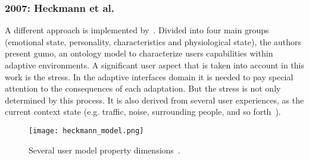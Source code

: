 
\subsubsection{2007: Heckmann et al.}
\label{sec:heckmann}

A different approach is implemented by~\citet{heckmann_gumogeneral_2005}.
Divided into four main groups (emotional state, personality, characteristics and
physiological state), the authors present \ac{gumo}, an ontology model to 
characterize users capabilities within adaptive environments. A significant 
user aspect that is taken into account in this work is the stress. In the 
adaptive interfaces domain it is needed to pay special attention to the 
consequences of each adaptation. But the stress is not only determined  by this 
process. It is also derived from several user experiences, as the current 
context state (e.g. traffic, noise, surrounding people, and so 
forth~\citep{babisch_noise_stress_2002}).


\begin{figure}[H]
\centering
\texttt{[image: heckmann\_model.png]}
\caption{Several user model property
dimensions~\citep{heckmann_gumogeneral_2005}.}
\label{fig:heckmann_model}
\end{figure}

